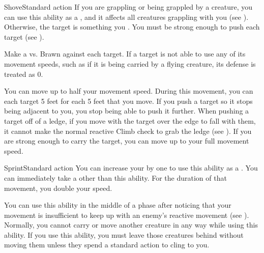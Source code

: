   \begin{activeability}{Shove}{Standard action}
    \abilitytags {}
    \rankline
    If you are grappling or being grappled by a creature, you can use this ability as a , and it affects all creatures grappling with you (see ).
    Otherwise, the target is something you .
    You must be strong enough to push each target (see ).

    Make a  vs. Brawn against each target.
    If a target is not able to use any of its movement speeds, such as if it is being carried by a flying creature, its defense is treated as 0.

    \hit You can move up to half your movement speed.
    During this movement, you can  each target 5 feet for each 5 feet that you move.
    If you push a target so it stops being adjacent to you, you stop being able to push it further.
    When pushing a target off of a ledge, if you move with the target over the edge to fall with them, it cannot make the normal reactive Climb check to grab the ledge (see ).
    \crit If you are strong enough to carry the target, you can move up to your full movement speed.
  \end{activeability}

  \begin{activeability}{Sprint}{Standard action}
    \abilitycost You can increase your  by one to use this ability as a .
    \rankline
    You can immediately take a  other than this ability.
    For the duration of that movement, you double your speed.

    You can use this ability in the middle of a phase after noticing that your movement is insufficient to keep up with an enemy's reactive movement (see ).
    Normally, you cannot carry or move another creature in any way while using this ability.
    If you use this ability, you must leave those creatures behind without moving them unless they spend a standard action to cling to you.
  \end{activeability}

